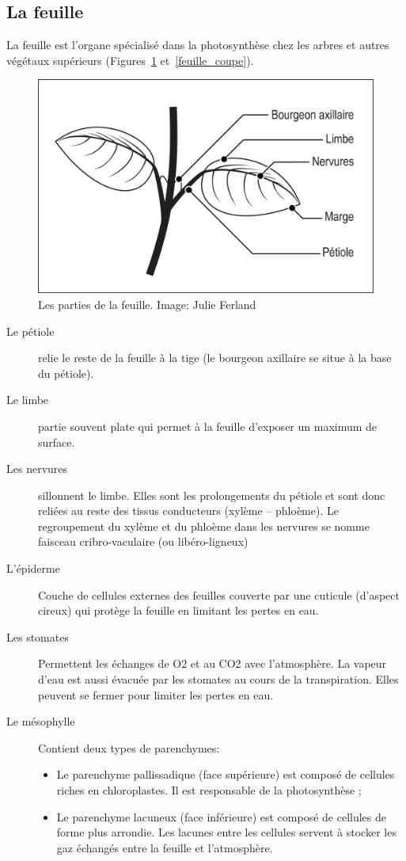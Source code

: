 \subsection{La feuille}

La feuille est l'organe spécialisé dans la photosynthèse chez les arbres et autres végétaux supérieurs (Figures~\ref{feuille} et~\ref{feuille_coupe}). 

\begin{figure}[h]
\centering
\includegraphics[scale=0.5]{img/ch2_feuille}
\caption{Les parties de la feuille. Image: Julie Ferland }
\label{feuille}
\end{figure}

\begin{description}
\item[Le pétiole] relie le reste de la feuille à la tige (le bourgeon axillaire se situe à la base du pétiole). 
\item[Le limbe] partie souvent plate qui permet à la feuille d'exposer un maximum de surface. 
\item[Les nervures] sillonnent le limbe. Elles sont les prolongements du pétiole et sont donc reliées au reste des tissus conducteurs (xylème – phloème). Le regroupement du xylème et du phloème dans les nervures se nomme faisceau cribro-vaculaire (ou libéro-ligneux) 
\item[L'épiderme] Couche de cellules externes des feuilles couverte par une cuticule (d'aspect cireux)  qui protège la feuille en limitant les pertes en eau.  
\item[Les stomates] Permettent les échanges de O2 et au CO2 avec l'atmosphère. La vapeur d'eau est aussi évacuée par les stomates au cours de la transpiration. Elles peuvent se fermer pour limiter les pertes en eau. 
\item [Le mésophylle] Contient deux types de parenchymes: 
\begin{itemize}
\item Le parenchyme pallissadique (face supérieure) est composé de cellules riches en chloroplastes. Il est responsable de la photosynthèse ; 
\item Le parenchyme lacuneux (face inférieure) est composé de cellules de forme plus arrondie. Les lacunes entre les cellules servent à stocker les gaz échangés entre la feuille et l'atmosphère.
\end{itemize}
 
\end{description}

